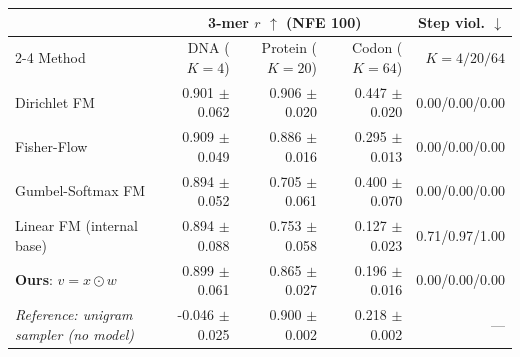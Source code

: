 \begin{tabular}{lrrrr}
\toprule
& \multicolumn{3}{c}{3-mer $r$ $\uparrow$ (NFE 100)} & Step viol. $\downarrow$ \\
\cmidrule(lr){2-4}
Method & DNA ($K{=}4$) & Protein ($K{=}20$) & Codon ($K{=}64$) & $K{=}4/20/64$ \\
\midrule
Dirichlet FM~\citep{stark2024dirichlet} & 0.901 $\pm$ 0.062 & 0.906 $\pm$ 0.020 & 0.447 $\pm$ 0.020 & 0.00/0.00/0.00 \\
Fisher-Flow~\citep{davis2024fisher} & 0.909 $\pm$ 0.049 & 0.886 $\pm$ 0.016 & 0.295 $\pm$ 0.013 & 0.00/0.00/0.00 \\
Gumbel-Softmax FM~\citep{tang2025gumbel} & 0.894 $\pm$ 0.052 & 0.705 $\pm$ 0.061 & 0.400 $\pm$ 0.070 & 0.00/0.00/0.00 \\
\midrule
Linear FM (internal base) & 0.894 $\pm$ 0.088 & 0.753 $\pm$ 0.058 & 0.127 $\pm$ 0.023 & 0.71/0.97/1.00 \\
\textbf{Ours}: $v = x \odot w$ & 0.899 $\pm$ 0.061 & 0.865 $\pm$ 0.027 & 0.196 $\pm$ 0.016 & 0.00/0.00/0.00 \\
\midrule
\emph{Reference: unigram sampler (no model)} & -0.046 $\pm$ 0.025 & 0.900 $\pm$ 0.002 & 0.218 $\pm$ 0.002 & --- \\
\bottomrule
\end{tabular}